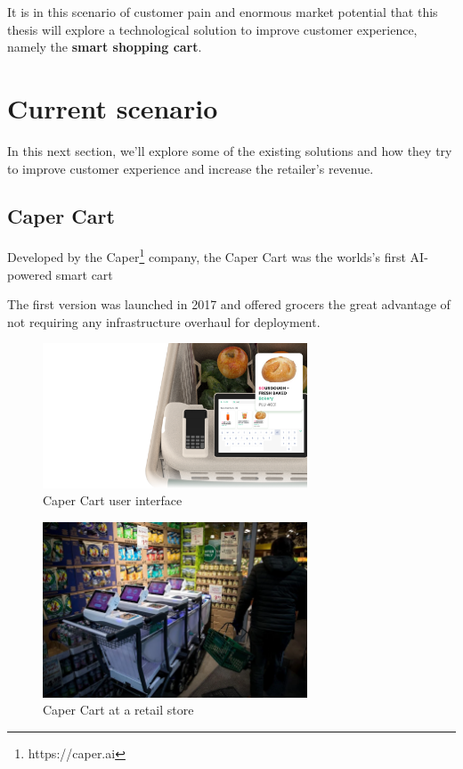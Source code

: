 \documentclass[openright]{normas-utf-tex} %
\begin{document}
It is in this scenario of customer pain and enormous market potential that this
thesis will explore a technological solution to improve customer experience,
namely the \textbf{smart shopping cart}.

\section{Current scenario}

In this next section, we'll explore some of the existing solutions and how they
try to improve customer experience and increase the retailer's revenue.

\subsection{Caper Cart}

Developed by the Caper\footnote{https://caper.ai} company, the Caper Cart was the worlds's first AI-powered smart cart \cite{Caper2020}

The first version was launched in 2017 and offered grocers the
great advantage of not requiring any infrastructure overhaul for deployment.

\begin{figure}[H]
	\centering
	\includegraphics[width=0.7\textwidth]{./images/capercartui.png}
	\caption[Caper Cart user interface]{Caper Cart user interface}
	\label{fig:caperui}
\end{figure}

\begin{figure}[H]
	\centering
	\includegraphics[width=0.7\textwidth]{./images/caper.png}
	\caption[Caper Cart at a retail store]{Caper Cart at a retail store}
	\label{fig:caperatretail}
\end{figure}
\end{document}
